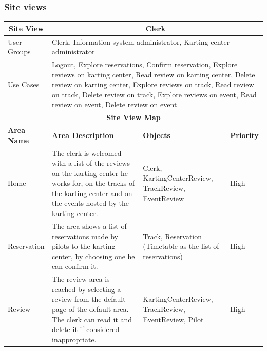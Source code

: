 \documentclass{beamer}
\begin{document}
\begin{frame}
    \frametitle{Site views}
    \begin{table}
        \centering
        \tiny
        \setlength{\tabcolsep}{1pt}
        \begin{tabular}{|m{2cm}|m{4cm}|m{3cm}|m{1cm}|}
        \hline
        \multicolumn{1}{|c|}{\textbf{Site View}} & \multicolumn{3}{c|}{\textbf{Clerk}} \\
        \hline
        User Groups & \multicolumn{3}{m{8cm}|}{Clerk, 
        Information system administrator, Karting center administrator} \\
        \hline
        Use Cases & \multicolumn{3}{m{8cm}|}{Logout, Explore reservations, Confirm reservation,
        Explore reviews on karting center, Read review on karting center, Delete review on karting center,
        Explore reviews on track, Read review on track, Delete review on track, Explore reviews on event,
        Read review on event, Delete review on event} \\
        \hline
        \multicolumn{4}{|c|}{\textbf{Site View Map}} \\
        \hline
        \textbf{Area Name} & \textbf{Area Description} & \textbf{Objects} & \textbf{Priority} \\
        \hline
        Home & The clerk is welcomed with a list of the reviews on the karting center he works for,
        on the tracks of the karting center and on the events hosted by the karting center.
         & Clerk, KartingCenterReview, TrackReview, EventReview & High \\
        \hline
        Reservation & The area shows a list of reservations made by pilots to the karting center,
        by choosing one he can confirm it.
         & Track, Reservation (Timetable as the list of reservations) & High \\
        \hline
        Review & The review area is reached by selecting a review from the default page of the default area. 
        The clerk can read it and delete it
        if considered inappropriate.
         & KartingCenterReview, TrackReview, EventReview, Pilot & High \\
        \hline
        \end{tabular}
    \end{table}
\end{frame}
\end{document}
